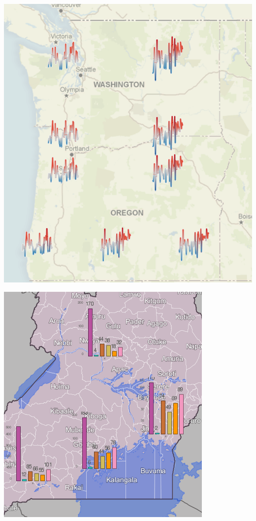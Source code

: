 \begin{itemize}
\begin{itemize}
\parbox [h]{0.4\textwidth }{
    \includegraphics [width=\linewidth]{figures/dia_map_sparklines.png}
    \label{fig:dia-map-sparklines}
}
\hfill
\hspace{0.5cm}
\parbox [h]{0.4\textwidth }{
    \includegraphics [width=\linewidth]{figures/dia_map_barchart.png}
}
\end{itemize}
\end{itemize}
